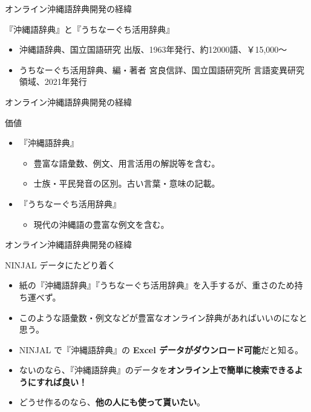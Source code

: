 \documentclass[14pt]{beamer}
\begin{document}


\begin{frame}{オンライン沖縄語辞典開発の経緯}
  \begin{block}{『沖縄語辞典』と『うちなーぐち活用辞典』}
    \begin{itemize}
    \item 沖縄語辞典、国立国語研究 出版、1963年発行、約12000語、￥15,000〜
    \item うちなーぐち活用辞典、編・著者 宮良信詳、国立国語研究所 言語変異研究領域、2021年発行
    \end{itemize}
  \end{block}
\end{frame}

\begin{frame}{オンライン沖縄語辞典開発の経緯}
  \begin{block}{価値}
    \begin{itemize}
    \item 『沖縄語辞典』
      \begin{itemize}
      \item 豊富な語彙数、例文、用言活用の解説等を含む。
      \item 士族・平民発音の区別。古い言葉・意味の記載。
      \end{itemize}
    \item 『うちなーぐち活用辞典』
      \begin{itemize}
      \item 現代の沖縄語の豊富な例文を含む。
      \end{itemize}
    \end{itemize}
  \end{block}  
\end{frame}


\begin{frame}{オンライン沖縄語辞典開発の経緯}
  \begin{block}{NINJAL データにたどり着く}
    \begin{itemize}
    \item 紙の『沖縄語辞典』『うちなーぐち活用辞典』を入手するが、重さのため持ち運べず。
    \item このような語彙数・例文などが豊富なオンライン辞典があればいいのになと思う。
    \item NINJAL で『沖縄語辞典』の \textbf{Excel データがダウンロード可能}だと知る。
    \item ないのなら、『沖縄語辞典』のデータを\textbf{オンライン上で簡単に検索できるようにすれば良い！}
    \item どうせ作るのなら、\textbf{他の人にも使って貰いたい}。      
    \end{itemize}
  \end{block}
\end{frame}
\end{document}
